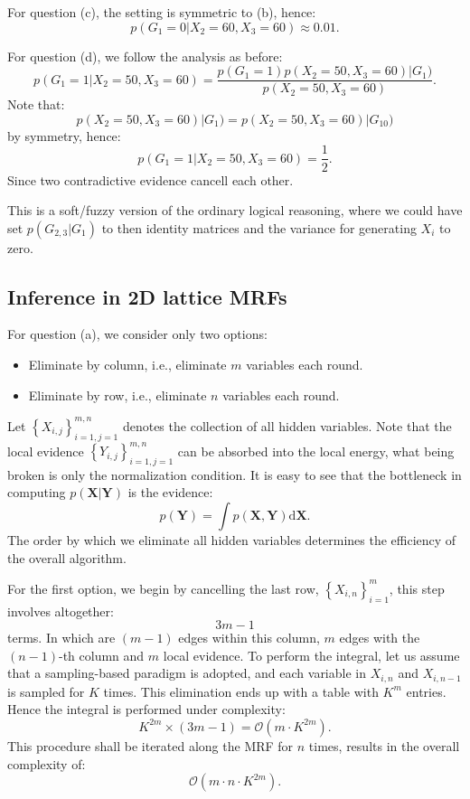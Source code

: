 \documentclass[UTF8]{ctexart}
\begin{document}
For question (c), the setting is symmetric to (b), hence:
$$p(G_{1}=0|X_{2}=60,X_{3}=60)\approx 0.01.$$

For question (d), we follow the analysis as before:
$$p(G_{1}=1|X_{2}=50,X_{3}=60)=\frac{p(G_{1}=1)p(X_{2}=50,X_{3}=60)|G_{1})}{p(X_{2}=50,X_{3}=60)}.$$
Note that:
$$p(X_{2}=50,X_{3}=60)|G_{1})=p(X_{2}=50,X_{3}=60)|G_{10})$$
by symmetry, hence:
$$p(G_{1}=1|X_{2}=50,X_{3}=60)=\frac{1}{2}.$$
Since two contradictive evidence cancell each other.

This is a soft/fuzzy version of the ordinary logical reasoning, where we could have set $p(G_{2,3}|G_{1})$ to then identity matrices and the variance for generating $X_{i}$ to zero. 


\subsection{Inference in 2D lattice MRFs}
For question (a), we consider only two options:
\begin{itemize}
\item Eliminate by column, i.e., eliminate $m$ variables each round.
\item Eliminate by row, i.e., eliminate $n$ variables each round.
\end{itemize}
Let $\left\{X_{i,j} \right\}_{i=1,j=1}^{m,n}$ denotes the collection of all hidden variables. 
Note that the local evidence $\left\{Y_{i,j} \right\}_{i=1,j=1}^{m,n}$ can be absorbed into the local energy, what being broken is only the normalization condition.
It is easy to see that the bottleneck in computing $p(\textbf{X}|\textbf{Y})$ is the evidence:
$$p(\textbf{Y})=\int p(\textbf{X},\textbf{Y})\text{d}\textbf{X}.$$
The order by which we eliminate all hidden variables determines the efficiency of the overall algorithm. 

For the first option, we begin by cancelling the last row, $\left\{X_{i,n}\right\}_{i=1}^{m}$, this step involves altogether:
$$3m-1$$ 
terms.
In which are $(m-1)$ edges within this column, $m$ edges with the $(n-1)$-th column and $m$ local evidence. 
To perform the integral, let us assume that a sampling-based paradigm is adopted, and each variable in $X_{i,n}$ and $X_{i,n-1}$ is sampled for $K$ times. 
This elimination ends up with a table with $K^{m}$ entries.
Hence the integral is performed under complexity:
$$K^{2m}\times (3m-1)=\mathcal{O}(m\cdot K^{2m}).$$
This procedure shall be iterated along the MRF for $n$ times, results in the overall complexity of:
$$\mathcal{O}(m\cdot n\cdot K^{2m}).$$
\end{document}
